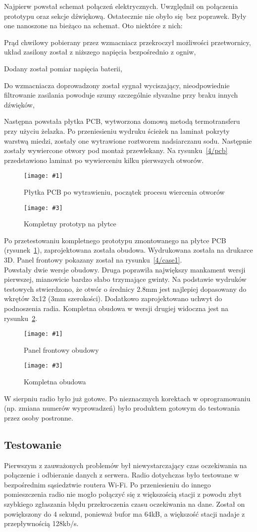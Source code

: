 \documentclass[12pt]{report}
\let\tempone\itemize
\let\temptwo\enditemize
\renewenvironment{itemize}{\tempone\setlength{\itemsep}{0cm}}{\temptwo}
\newcommand{\imgintss}[5]{
	\begin{figure}[{#5}]
		\centering
		\begin{minipage}{.45\textwidth}
			\centering
			\texttt{[image: \#1]}
			\caption{#2}
			\label{#1}
		\end{minipage}%
		\hfill
		\begin{minipage}{.45\textwidth}
			\centering
			\texttt{[image: \#3]}
			\caption{#4}
			\label{#3}
		\end{minipage}
	\end{figure}
}
\newcommand{\imghss}[4]{\imgintss{#1}{#2}{#3}{#4}{H}}
\begin{document}
			Najpierw powstał schemat połączeń elektrycznych. Uwzględnił on połączenia prototypu oraz sekcje dźwiękową. Ostatecznie nie obyło się bez poprawek. Były one nanoszone na bieżąco na schemat. Oto niektóre z nich:
			\begin{itemize}
				\item Prąd chwilowy pobierany przez wzmacniacz przekroczył możliwości przetwornicy, układ zasilony został z niższego napięcia bezpośrednio z ogniw,
				\item Dodany został pomiar napięcia baterii,
				\item Do wzmacniacza doprowadzony został sygnał wyciszający, nieodpowiednie filtrowanie zasilania powoduje szumy szczególnie słyszalne przy braku innych dźwięków,
			\end{itemize}
			
			Następna powstała płytka PCB, wytworzona domową metodą termotransferu przy użyciu żelazka\textsuperscript{\cite{ch4_pcb_method}}. Po przeniesieniu wydruku ścieżek na laminat pokryty warstwą miedzi, zostały one wytrawione roztworem nadsiarczanu sodu. Następnie zostały wywiercone otwory pod montaż przewlekany. Na rysunku~\ref{4/pcb} przedstawiono laminat po wywierceniu kilku pierwszych otworów.
			
			\imghss{4/pcb}{Płytka PCB po wytrawieniu, początek procesu wiercenia otworów}{4/prototype_3}{Kompletny prototyp na płytce}
			
			Po przetestowaniu kompletnego prototypu zmontowanego na płytce PCB (rysunek~\ref{4/prototype_3}), zaprojektowana została obudowa. Wydrukowana została na drukarce 3D. Panel frontowy pokazany został na rysunku~\ref{4/case1}.
			$ $\\
			
			Powstały dwie wersje obudowy. Druga poprawiła największy mankament wersji pierwszej, mianowicie bardzo słabo trzymające gwinty. Na podstawie wydruków testowych stwierdzono, że otwór o średnicy 2.8mm jest najlepiej dopasowany do wkrętów 3x12 (3mm szerokości). Dodatkowo zaprojektowano uchwyt do podnoszenia radia. Kompletna obudowa w wersji drugiej widoczna jest na rysunku~\ref{4/case2}.
			
			\imghss{4/case1}{Panel frontowy obudowy}{4/case2}{Kompletna obudowa}
			
			W sierpniu radio było już gotowe. Po nieznacznych korektach w oprogramowaniu (np. zmiana numerów wyprowadzeń) było produktem gotowym do testowania przez osoby postronne.

		\subsection{Testowanie}
			Pierwszym z zauważonych problemów był niewystarczający czas oczekiwania na połączenie i odbieranie danych z serwera. Radio dotychczas było testowane w bezpośrednim sąsiedztwie routera Wi-Fi. Po przeniesieniu do innego pomieszczenia radio nie mogło połączyć się z większością stacji z powodu zbyt szybkiego zgłaszania błędu przekroczenia czasu oczekiwania na dane. Został on powiększony do 4 sekund, ponieważ bufor ma 64kB, a większość stacji nadaje z przepływnością 128kb/s.
			$ $\\
			
\end{document}
